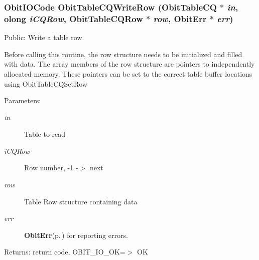 \subsubsection{\setlength{\rightskip}{0pt plus 5cm}Obit\-IOCode Obit\-Table\-CQWrite\-Row ({\bf Obit\-Table\-CQ} $\ast$ {\em in}, {\bf olong} {\em i\-CQRow}, {\bf Obit\-Table\-CQRow} $\ast$ {\em row}, {\bf Obit\-Err} $\ast$ {\em err})}\label{ObitTableCQ_8c_a24}


Public: Write a table row. 

Before calling this routine, the row structure needs to be initialized and filled with data. The array members of the row structure are pointers to independently allocated memory. These pointers can be set to the correct table buffer locations using Obit\-Table\-CQSet\-Row \begin{Desc}
\item[Parameters:]
\begin{description}
\item[{\em in}]Table to read \item[{\em i\-CQRow}]Row number, -1 -$>$ next \item[{\em row}]Table Row structure containing data \item[{\em err}]{\bf Obit\-Err}{\rm (p.\,\pageref{structObitErr})} for reporting errors. \end{description}
\end{Desc}
\begin{Desc}
\item[Returns:]return code, OBIT\_\-IO\_\-OK=$>$ OK \end{Desc}
